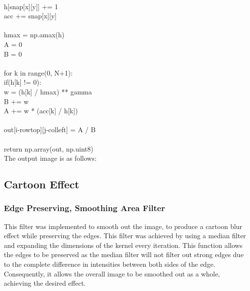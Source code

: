 \documentclass{article}
\begin{document}
	\\
	\indent \indent \indent \indent \indent h[snap[x][y]] += 1\\
	\indent \indent \indent \indent \indent acc += snap[x][y]\\
	\\
	\indent \indent \indent h\textunderscore max = np.amax(h)\\
	\indent \indent \indent A = 0 \\
	\indent \indent \indent B = 0 \\
	\\
	\indent \indent \indent for k in range(0, N+1):\\
	\indent \indent \indent \indent if(h[k] != 0):\\
	\indent \indent \indent \indent \indent w = (h[k] / h\textunderscore max) ** gamma\\
	\indent \indent \indent \indent \indent B += w\\
	\indent \indent \indent \indent \indent A += w * (acc[k] / h[k])\\
	\\
	\indent \indent \indent out[i-row\textunderscore top][j-col\textunderscore left] = A / B\\
	\\
	\indent return np.array(out, np.uint8)\\
	
	The output image is as follows:\\
	
	\subsection{Cartoon Effect}
	
	\subsubsection{Edge Preserving, Smoothing Area Filter}
	
	This filter was implemented to smooth out the image, to produce a cartoon blur effect while preserving the edges. This filter was achieved by using a median filter and expanding the dimensions of the kernel every iteration. This function allows the edges to be preserved as the median filter will not filter out strong edges due to the complete difference in intensities between both sides of the edge. Consequently, it allows the overall image to be smoothed out as a whole, achieving the desired effect.\\
	
\end{document}

